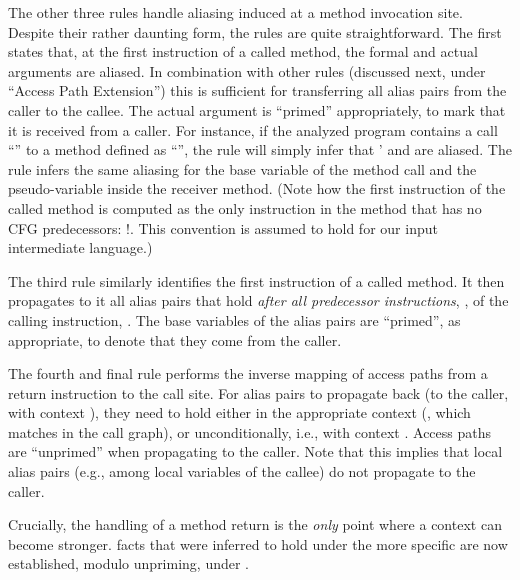 The other three rules handle aliasing induced at a method invocation site. Despite their rather daunting form, the rules are quite straightforward. The first states that, at the first instruction of a called method, the formal and actual arguments are aliased. In combination with other rules (discussed next, under ``Access Path Extension'') this is sufficient for transferring all alias pairs from the caller to the callee. The actual argument is ``primed'' appropriately, to mark that it is received from a caller. For instance, if the analyzed program contains a call ``'' to a method defined as ``'', the rule will simply infer that ' and  are aliased. The rule infers the same aliasing for the base variable of the method call and the pseudo-variable  inside the receiver method. (Note how the first instruction of the called method is computed as the only instruction in the method that has no CFG predecessors: \dlforall{}  \dlThen{} !.  This convention is assumed to hold for our input intermediate language.)

The third rule similarly identifies the first instruction of a called method. It then propagates to it all alias pairs that hold \emph{after all predecessor instructions}, , of the calling instruction, . The base variables of the alias pairs are ``primed'', as appropriate, to denote that they come from the caller.

The fourth and final rule performs the inverse mapping of access paths from a return instruction to the call site. For alias pairs to propagate back (to the caller, with context ), they need to hold either in the appropriate context (, which matches  in the call graph), or unconditionally, i.e., with context \ctxAll{}. Access paths are ``unprimed'' when propagating to the caller. Note that this implies that local alias pairs (e.g., among local variables of the callee) do not propagate to the caller.

Crucially, the handling of a method return is the \emph{only} point where a context can become stronger.  facts that were inferred to hold under the more specific  are now established, modulo unpriming, under .

